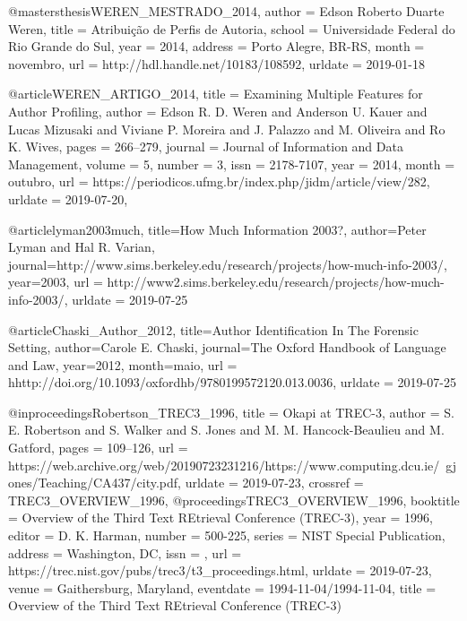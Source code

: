 {@mastersthesis{WEREN_MESTRADO_2014,
  author       = {Edson Roberto Duarte Weren}, 
  title        = {Atribuição de Perfis de Autoria},
  school       = {Universidade Federal do Rio Grande do Sul},
  year         = {2014},
  address      = {Porto Alegre, BR-RS},
  month        = {novembro},
  url          = {http://hdl.handle.net/10183/108592},
  urldate      = {2019-01-18}
}

@article{WEREN_ARTIGO_2014,
    title = {{E}xamining {M}ultiple {F}eatures for {A}uthor {P}rofiling},
    author = {Edson R. D. Weren and Anderson U. Kauer and Lucas Mizusaki and Viviane P. Moreira and J. Palazzo and M. Oliveira and Ro K. Wives},
    pages = {266--279},
    journal = {Journal of Information and Data Management},
    volume = {5},
    number = {3},
    issn = {2178-7107},
    year = {2014},
    month = {outubro},
    url  = {https://periodicos.ufmg.br/index.php/jidm/article/view/282},
    urldate = {2019-07-20},
}

@article{lyman2003much,
  title={How Much Information 2003?},
  author={Peter Lyman and Hal R. Varian},
  journal={http://www.sims.berkeley.edu/research/projects/how-much-info-2003/},
  year={2003},
  url = {http://www2.sims.berkeley.edu/research/projects/how-much-info-2003/},
  urldate = {2019-07-25}
}

@article{Chaski_Author_2012,
  title={{A}uthor {I}dentification {I}n {T}he {F}orensic {S}etting},
  author={Carole E. Chaski},
  journal={The Oxford Handbook of Language and Law},
  year={2012},
  month={maio},
  url = {hhttp://doi.org/10.1093/oxfordhb/9780199572120.013.0036},
  urldate = {2019-07-25}
}
 
@inproceedings{Robertson_TREC3_1996,
  title        = {Okapi at {TREC-3}},
  author       = {S. E. Robertson and S. Walker and S. Jones and M. M. Hancock-Beaulieu and M. Gatford},
  pages = {109--126},
  url          = {https://web.archive.org/web/20190723231216/https://www.computing.dcu.ie/~gjones/Teaching/CA437/city.pdf},
  urldate      = {2019-07-23},
  crossref = {TREC3_OVERVIEW_1996},
}
@proceedings{TREC3_OVERVIEW_1996,
  booktitle    = {Overview of the Third Text REtrieval Conference (TREC-3)},
  year = {1996},
  editor = {D. K. Harman},
  number = {500-225},
  series = {NIST Special Publication},
  address = {Washington, DC},
  issn = {},
  url = {https://trec.nist.gov/pubs/trec3/t3_proceedings.html},
  urldate      = {2019-07-23},
  venue        = {Gaithersburg, Maryland},
  eventdate    = {1994-11-04/1994-11-04},
  title = {Overview of the Third Text REtrieval Conference (TREC-3)}
}

}

